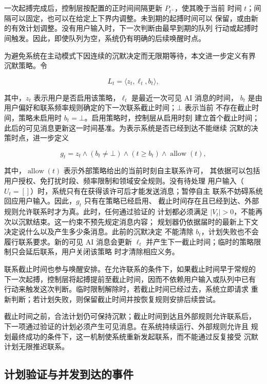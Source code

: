 \documentclass[manuscript,nonacm]{acmart}
\begin{document}
一次起搏完成后，控制层按配置的正时间间隔更新 $P_{t^+}$，使其晚于当前
时间 $t$；间隔可以固定，也可以在给定上下界内调整。未到期的起搏时间可以
保留，或由新的有效计划调整。没有用户输入时，下一次判断由最早到期的队列
行动或起搏时间触发。因此，即使队列为空，系统仍有明确的后续唤醒时点。

为避免系统在主动模式下因连续的沉默决定而无限期等待，本文进一步定义有界
沉默策略。令

\begin{equation}
L_t=\langle z_t,\ell_t,b_t\rangle,
\end{equation}

其中，$z_t$ 表示用户是否启用该策略，$\ell_t$ 是最近一次可见 AI 消息的时间，
$b_t$ 是由用户偏好和联系频率规则确定的下一次联系截止时间；$\bot$ 表示当前
不存在截止时间，策略未启用时 $b_t=\bot$。启用策略时，控制层从启用时刻
建立首个截止时间；此后的可见消息更新这一时间基准。为表示系统是否已经到达不能继续
沉默的决策时点，进一步定义

\begin{equation}
g_t=z_t\land(b_t\neq\bot)\land(t\geq b_t)
\land\operatorname{allow}(t),
\end{equation}

其中，$\operatorname{allow}(t)$ 表示外部策略给出的当前时刻自主联系许可，
其依据可以包括用户授权、免打扰时段、频率限制和领域安全规则。没有待处理
用户输入（$U_t=[]$）时，系统只有在获得该许可后才能发送消息；暂停自主
联系不妨碍系统回应用户输入。因此，$g_t$ 只有在策略已经启用、
截止时间存在且已经到达、外部规则允许联系时才为真。此时，任何通过验证的
计划都必须满足 $|V_t|>0$，不能再次以沉默结束。这一约束不预先规定消息内容；
规划器仍依据届时的最新上下文决定说什么以及产生多少条消息。此前的沉默决定
不能清除 $b_t$，计划失败也不会履行联系要求。新的可见 AI 消息会更新
$\ell_t$ 并产生下一截止时间；临时的策略限制只会延后联系，用户关闭该策略
时才清除相应义务。

联系截止时间也参与唤醒安排。在允许联系的条件下，如果截止时间早于常规的
下一次起搏，控制层将起搏提前至截止时间，因而不依赖用户输入或队列中已有
行动来触发这次判断。临时限制解除时，若截止时间已经过去，系统立即请求
重新判断；若计划失败，则保留截止时间并按恢复规则安排后续尝试。

截止时间之前，合法计划仍可保持沉默；截止时间到达且外部规则允许联系后，
下一项通过验证的计划必须产生可见消息。在系统持续运行、外部规则允许且
规划最终成功的条件下，这一机制使系统重新发起联系，而不能通过反复接受
沉默计划无限推迟联系。

\subsection{计划验证与并发到达的事件}
\end{document}
